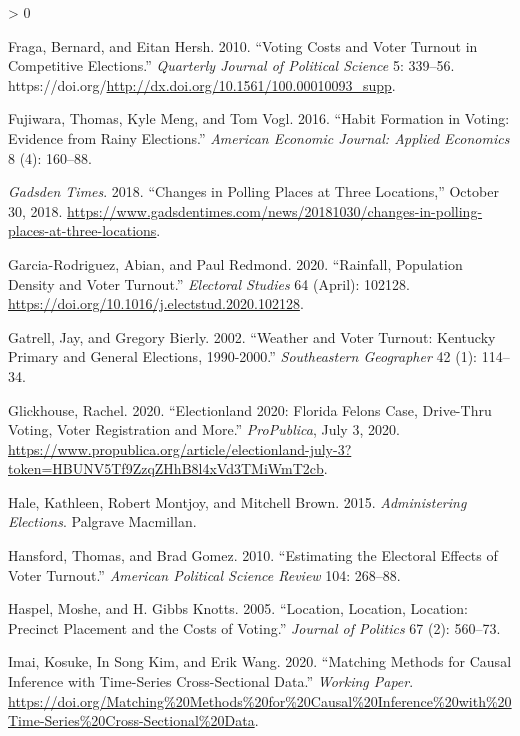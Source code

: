 \documentclass[
  12pt,
]{article}
\newlength{\cslhangindent}
\newenvironment{CSLReferences}[2] %
 {%
  \setlength{\parindent}{0pt}
  \ifodd #1 \everypar{\setlength{\hangindent}{\cslhangindent}}\ignorespaces\fi
  \ifnum #2 > 0
  \setlength{\parskip}{#2\baselineskip}
  \fi
 }%
 {}
\begin{document}
\begin{CSLReferences}{1}{0}
\leavevmode\hypertarget{ref-Fraga2010}{}%
Fraga, Bernard, and Eitan Hersh. 2010. {``Voting {Costs} and {Voter Turnout} in {Competitive Elections}.''} \emph{Quarterly Journal of Political Science} 5: 339--56. https://doi.org/\url{http://dx.doi.org/10.1561/100.00010093_supp}.

\leavevmode\hypertarget{ref-Fujiwara2016}{}%
Fujiwara, Thomas, Kyle Meng, and Tom Vogl. 2016. {``Habit {Formation} in {Voting}: Evidence from {Rainy Elections}.''} \emph{American Economic Journal: Applied Economics} 8 (4): 160--88.

\leavevmode\hypertarget{ref-gadsdentimes2018}{}%
\emph{Gadsden Times}. 2018. {``Changes in Polling Places at Three Locations,''} October 30, 2018. \url{https://www.gadsdentimes.com/news/20181030/changes-in-polling-places-at-three-locations}.

\leavevmode\hypertarget{ref-Garcia-Rodriguez2020}{}%
Garcia-Rodriguez, Abian, and Paul Redmond. 2020. {``Rainfall, Population Density and Voter Turnout.''} \emph{Electoral Studies} 64 (April): 102128. \url{https://doi.org/10.1016/j.electstud.2020.102128}.

\leavevmode\hypertarget{ref-Gatrell2002}{}%
Gatrell, Jay, and Gregory Bierly. 2002. {``Weather and {Voter Turnout}: Kentucky {Primary} and {General Elections}, 1990-2000.''} \emph{Southeastern Geographer} 42 (1): 114--34.

\leavevmode\hypertarget{ref-Glickhouse2020}{}%
Glickhouse, Rachel. 2020. {``Electionland 2020: Florida {Felons Case}, {Drive}-{Thru Voting}, {Voter Registration} and {More}.''} \emph{ProPublica}, July 3, 2020. \url{https://www.propublica.org/article/electionland-july-3?token=HBUNV5Tf9ZzqZHhB8l4xVd3TMiWmT2cb}.

\leavevmode\hypertarget{ref-Hale2015}{}%
Hale, Kathleen, Robert Montjoy, and Mitchell Brown. 2015. \emph{Administering {Elections}}. {Palgrave Macmillan}.

\leavevmode\hypertarget{ref-Hansford2010}{}%
Hansford, Thomas, and Brad Gomez. 2010. {``Estimating the {Electoral Effects} of {Voter Turnout}.''} \emph{American Political Science Review} 104: 268--88.

\leavevmode\hypertarget{ref-Haspel2005}{}%
Haspel, Moshe, and H. Gibbs Knotts. 2005. {``Location, {Location}, {Location}: Precinct {Placement} and the {Costs} of {Voting}.''} \emph{Journal of Politics} 67 (2): 560--73.

\leavevmode\hypertarget{ref-Imai2020}{}%
Imai, Kosuke, In Song Kim, and Erik Wang. 2020. {``Matching {Methods} for {Causal Inference} with {Time}-{Series Cross}-{Sectional Data}.''} \emph{Working Paper}. \url{https://doi.org/Matching\%20Methods\%20for\%20Causal\%20Inference\%20with\%20Time-Series\%20Cross-Sectional\%20Data}.


\end{CSLReferences}
\end{document}
